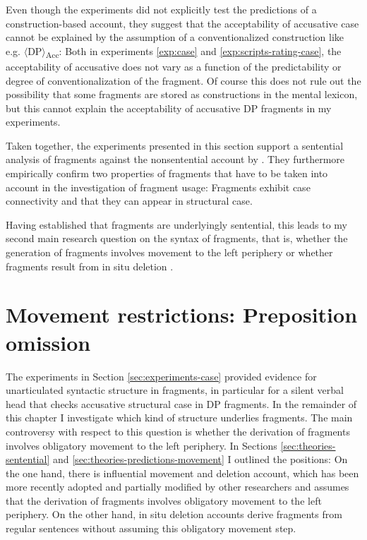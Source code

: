 Even though the experiments did not explicitly test the predictions of a con\-struc\-tion-based account, they suggest that the acceptability of accusative case cannot be explained by the assumption of a conventionalized construction like e.g. $\langle$DP$\rangle$\textsubscript{Acc}: Both in experiments \ref{exp:case} and \ref{exp:scripts-rating-case}, the acceptability of accusative does not vary as a function of the predictability or degree of conventionalization of the fragment. Of course this does not rule out the possibility that some fragments are stored as constructions in the mental lexicon, but this cannot explain the acceptability of accusative DP fragments in my experiments.

Taken together, the experiments presented in this section support a sentential analysis of fragments against the nonsentential account by \citet{barton.progovac2005}. They furthermore empirically confirm two properties of fragments that have to be taken into account in the investigation of fragment usage: Fragments exhibit case connectivity and that they can appear in structural case.

Having established that fragments are underlyingly sentential, this leads to my second main research question on the syntax of fragments, that is, whether the generation of fragments involves movement to the left periphery \citep{merchant2004} or whether fragments result from in situ deletion \citep{reich2007}.

\section{Movement restrictions: Preposition omission}\label{sec:pstranding}
\largerpage[-1]

The experiments in Section \ref{sec:experiments-case} provided evidence for unarticulated syntactic structure in fragments, in particular for a silent verbal head that checks accusative structural case in DP fragments. In the remainder of this chapter I investigate which kind of structure underlies fragments. The main controversy with respect to this question is whether the derivation of fragments involves obligatory movement to the left periphery. In Sections \ref{sec:theories-sentential} and \ref{sec:theories-predictions-movement} I outlined the positions: On the one hand, there is  influential movement and deletion account, which has been more recently adopted and partially modified by other researchers \citep[see e.g.][]{aelbrecht2009, sato2011,weir2014, doring2016, saab.liptak2016,  murphy2018} and assumes that the derivation of fragments involves obligatory movement to the left periphery. On the other hand, in situ deletion accounts \citep{reich2007, ott.struckmeier2016, griffiths.etal2018} derive fragments from regular sentences without assuming this obligatory movement step.

